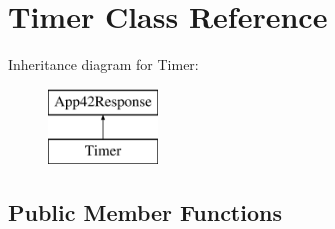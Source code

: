 \hypertarget{class_timer}{\section{Timer Class Reference}
\label{class_timer}
}
Inheritance diagram for Timer\+:\begin{figure}[H]
\begin{center}
\leavevmode
\includegraphics[height=2.000000cm]{class_timer}
\end{center}
\end{figure}
\subsection*{Public Member Functions}
